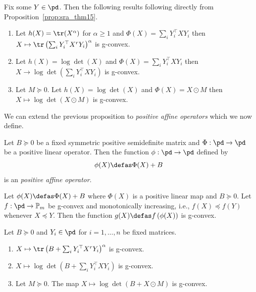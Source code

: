\documentclass[twoside,11pt]{article}
\begin{document}
%
\begin{example}
Fix some $Y \in \pd$. Then the following results following directly from Proposition~\ref{prop:sra_thm15}.
\begin{enumerate}
    \item Let $h(X) = \tr(X^\alpha)$ for $\alpha \geq 1$ and $\Phi(X) = \sum_i Y_i^\top X Y_i$ then  $X \mapsto \tr\left( \sum_i Y_i^\top X^r Y_i\right)^\alpha$ is g-convex.
    \item Let $h(X) = \log \det (X)$ and $\Phi(X) = \sum_i Y_i^\top X Y_i$ then $X \to \log \det\left(\sum_i Y_i^\top X Y_i\right)$ is g-convex.
    \item Let $M \succeq 0$. Let $h(X) = \log \det(X)$ and $\Phi(X) = X \odot M$ then
    $X \mapsto \log \det \left( X \odot M\right)$
    is g-convex.
\end{enumerate}
\end{example}

We can extend the previous proposition to \textit{positive affine operators} which we now define.

\begin{definition}
    Let $B \succeq 0$ be a fixed symmetric positive semidefinite matrix and $\Phi: \pd \to \pd$ be a positive linear operator. Then the function $\phi:\pd \to \pd$ defined by 
    \[
    \phi(X) \defas \Phi(X) + B
    \]
    is an \textit{positive affine operator}.
\end{definition}

\begin{prop}\label{prop:gcvx_affine_positive}

    Let  $\phi(X) \defas \Phi(X) + B$ where $\Phi(X)$ is a positive linear map and $B \succeq 0$. 
        Let $f: \pd \to \mathbb{P}_m$ be g-convex and monotonically increasing, i.e., $f(X) \preceq f(Y)$ whenever $X \preceq Y$. Then the function
        $g(X) \defas f\left( \phi(X)\right)$
        is g-convex.
\end{prop}

\begin{example}
Let $B \succeq 0$ and $Y_i \in \pd$ for $i = 1, \ldots, n$ be fixed matrices. 
    \begin{enumerate}
    \item  $X \mapsto \tr\left(B +  \sum_i Y_i^\top X^r Y_i\right)^\alpha$ is g-convex.
    \item $X \mapsto \log \det\left( B + \sum_i Y_i^\top X Y_i\right)$ is g-convex.
    \item Let $M \succeq 0$. The map
    $X \mapsto \log \det \left(B +  X \odot M\right)$
    is g-convex.
\end{enumerate}

\end{example}
\end{document}
